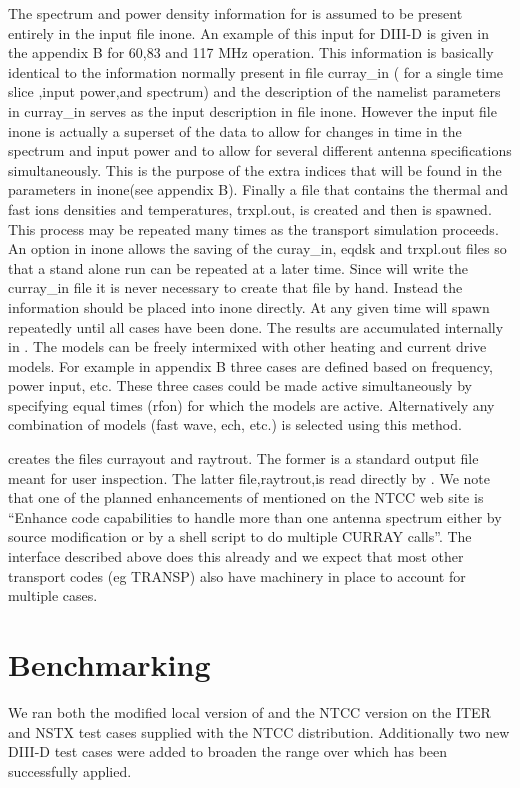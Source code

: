 The spectrum and power density  information for \ct is assumed to be
 present entirely  in the  \ot input file inone. An example of this
 input for DIII-D is given
 in the appendix B for 60,83 and 117 MHz operation.  This information is
basically identical to the information normally present in file
curray\_in ( for a single time slice ,input power,and spectrum) and
the description of the namelist parameters in curray\_in serves as
the input description in file inone. However the \ot input file inone
is actually a superset of the \ct data to allow for changes in time
in the spectrum and input power and to allow for several different
antenna specifications simultaneously. This is the purpose of the
extra indices that will be found in the parameters in inone(see
appendix B).
 Finally a file that contains the thermal and
fast ions densities and temperatures, trxpl.out, is created and then
\ct is spawned. This process may  be repeated many times as the 
transport simulation proceeds. An  option in inone allows the saving of
the curay\_in, eqdsk and trxpl.out files so that a stand alone \ct
run can be repeated at a later time. Since \ot will write the
curray\_in file it is never necessary to create that file by
hand. Instead the information should  be placed into inone directly.
 At any given
time \ot will spawn \ct repeatedly until all \ct cases have
been done. The results are accumulated internally in \ot. The \ct
models can be freely intermixed with other heating and current drive
models. For example in appendix B three \ct cases are defined
based on frequency, power input, etc. These three cases could  be made
active simultaneously  by specifying equal times (rfon) for which  the models
are active. Alternatively any combination of models (fast wave,
ech, etc.) is selected using this method. 

\ct creates the files currayout and raytrout. The former is
a standard \ct output file meant for user inspection. The latter
file,raytrout,is read directly by \ot.
 We note that one of the planned enhancements of \ct mentioned on
 the NTCC web site is ``Enhance code capabilities to handle more than
 one antenna  spectrum either by source modification or by a shell
 script to do multiple CURRAY calls''. The \ot interface described
 above  does this already and we expect that most other transport
 codes (eg TRANSP) also have machinery in place to account
 for multiple \ct cases.
 

\section{\ct Benchmarking}\label{benchm}
   We ran both the modified
 local version of \ct and the NTCC version on  the ITER and NSTX
 test cases  supplied with the NTCC \ct distribution. Additionally 
 two new DIII-D test cases  were added to broaden the range over 
 which \ct has been successfully applied.

